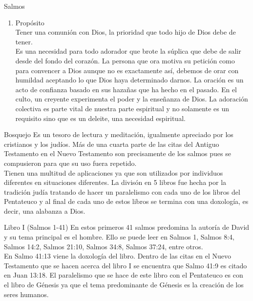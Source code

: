 \begin{section}{Salmos}
\begin{enumerate}
			La adoración a Dios.\\
			Dios es adorado por Su poder, por Su majestad y Su santidad. Los hombres maravillados por los atributos de Dios buscan una comunión íntima con ese Dios que personalmente los había escogido. \\
			Es necesario que haya una relación de amor mutuo entre el creador y su criatura, los salmos forman la colección más antigua de himnos y oraciones que tiene el pueblo de Dios. Podemos aprender como alabar a Dios y cómo es permitido que tengamos acceso a Él en oración, en el libro viene cómo debemos de orar y pedir.
		\item Propósito\\
			Tener una comunión con Dios, la prioridad que todo hijo de Dios debe de tener.\\
			Es una necesidad para todo adorador que brote la súplica que debe de salir desde del fondo del corazón. La persona que ora motiva su petición como para convencer a Dios aunque no es exactamente así, debemos de orar con humildad aceptando lo que Dios haya determinado darnos. La oración es un acto de confianza basado en sus hazañas que ha hecho en el pasado.
			\newpage
			En el culto, un creyente experimenta el poder y la enseñanza de Dios. La adoración colectiva es parte vital de nuestra parte espiritual y no solamente es un requisito sino que es un deleite, una necesidad espiritual.
	\end{enumerate}
	\begin{subsection}{Bosquejo}
		Es un tesoro de lectura y meditación, igualmente apreciado por los cristianos y los judíos. Más de una cuarta parte de las citas del Antiguo Testamento en el Nuevo Testamento son precisamente de los salmos pues se compusieron para que su uso fuera repetido.\\
		Tienen una multitud de aplicaciones ya que son utilizados por individuos diferentes en situaciones diferentes. La divisón en 5 libros fue hecha por la tradición judía tratando de hacer un paralelismo con cada uno de los libros del Pentateuco y al final de cada uno de estos libros se termina con una doxología, es decir, una alabanza a Dios.
		\begin{subsubsection}{Libro I (Salmos 1-41)}
			En estos primeros 41 salmos predomina la autoría de David y su tema principal es el hombre. Ello se puede leer en Salmos 1, Salmos 8:4, Salmos 14:2, Salmos 21:10, Salmos 34:8, Salmos 37:24, entre otros.\\
			En Salmo 41:13 viene la doxología del libro. Dentro de las citas en el Nuevo Testamento que se hacen acerca del libro I se encuentra que Salmo 41:9 es citado en Juan 13:18. El paralelismo que se hace de este libro con el Pentateuco es con el libro de Génesis ya que el tema predominante de Génesis es la creación de los seres humanos.

\end{subsubsection}
\end{subsection}
\end{section}
